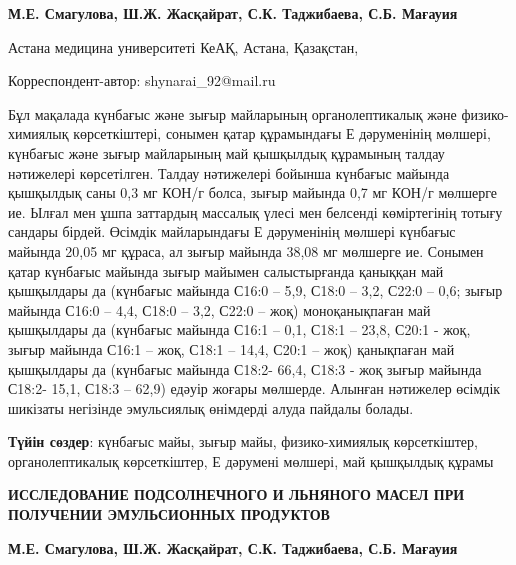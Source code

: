 
\begin{articleheader}

{\bfseries
М.Е. Смагулова,
Ш.Ж. Жасқайрат\textsuperscript{\envelope },
С.К. Таджибаева,
С.Б. Мағауия
}
\end{articleheader}

\begin{affiliation}
Астана медицина университеті КеАҚ, Астана, Қазақстан,

\raggedright \textsuperscript{\envelope }Корреспондент-автор: shynarai\_92@mail.ru
\end{affiliation}

Бұл мақалада күнбағыс және зығыр майларының органолептикалық және
физико-химиялық көрсеткіштері, сонымен қатар құрамындағы Е дәруменінің
мөлшері, күнбағыс және зығыр майларының май қышқылдық құрамының талдау
нәтижелері көрсетілген. Талдау нәтижелері бойынша күнбағыс майында
қышқылдық саны 0,3 мг КОН/г болса, зығыр майында 0,7 мг КОН/г мөлшерге
ие. Ылғал мен ұшпа заттардың массалық үлесі мен белсенді көміртегінің
тотығу сандары бірдей. Өсімдік майларындағы Е дәруменінің мөлшері
күнбағыс майында 20,05 мг құраса, ал зығыр майында 38,08 мг мөлшерге ие.
Сонымен қатар күнбағыс майында зығыр майымен салыстырғанда қаныққан май
қышқылдары да (күнбағыс майында С16:0 -- 5,9, С18:0 -- 3,2, С22:0 --
0,6; зығыр майында С16:0 -- 4,4, С18:0 -- 3,2, С22:0 -- жоқ)
моноқанықпаған май қышқылдары да (күнбағыс майында С16:1 -- 0,1, С18:1
-- 23,8, С20:1 - жоқ, зығыр майында С16:1 -- жоқ, С18:1 -- 14,4, С20:1
-- жоқ) қанықпаған май қышқылдары да (күнбағыс майында С18:2- 66,4,
С18:3 - жоқ зығыр майында С18:2- 15,1, С18:3 -- 62,9) едәуір жоғары
мөлшерде. Алынған нәтижелер өсімдік шикізаты негізінде эмульсиялық
өнімдерді алуда пайдалы болады.

{\bfseries Түйін сөздер}: күнбағыс майы, зығыр майы, физико-химиялық
көрсеткіштер, органолептикалық көрсеткіштер, Е дәрумені мөлшері, май
қышқылдық құрамы

\begin{articleheader}
{\bfseries ИССЛЕДОВАНИЕ ПОДСОЛНЕЧНОГО И ЛЬНЯНОГО МАСЕЛ ПРИ ПОЛУЧЕНИИ
ЭМУЛЬСИОННЫХ ПРОДУКТОВ}

{\bfseries
М.Е. Смагулова,
Ш.Ж. Жасқайрат\textsuperscript{\envelope },
С.К. Таджибаева,
С.Б. Мағауия
}
\end{articleheader}

